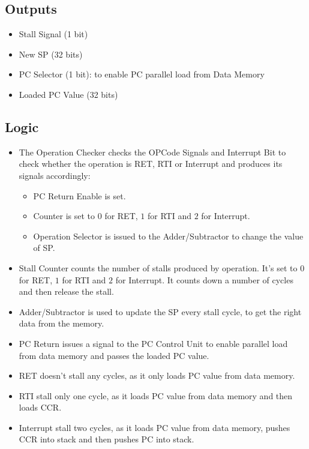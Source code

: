 \subsection{Outputs}
\begin{itemize}
    \item Stall Signal (1 bit)
    \item New SP (32 bits)
    \item PC Selector (1 bit): to enable PC parallel load from Data Memory
    \item Loaded PC Value (32 bits)
\end{itemize}

\subsection{Logic}
\begin{itemize}
    \item The Operation Checker checks the OPCode Signals and Interrupt Bit to check whether the operation is RET, RTI or Interrupt and produces its signals accordingly:
    \begin{itemize}
        \item PC Return Enable is set.
        \item Counter is set to $0$ for RET, $1$ for RTI and $2$ for Interrupt.
        \item Operation Selector is issued to the Adder/Subtractor to change the value of SP.
    \end{itemize}
    \item Stall Counter counts the number of stalls produced by operation. It's set to $0$ for RET, $1$ for RTI and $2$ for Interrupt. It counts down a number of cycles and then release the stall.
    \item Adder/Subtractor is used to update the SP every stall cycle, to get the right data from the memory.
    \item PC Return issues a signal to the PC Control Unit to enable parallel load from data memory and passes the loaded PC value.
    \item RET doesn't stall any cycles, as it only loads PC value from data memory.
    \item RTI stall only one cycle, as it loads PC value from data memory and then loads CCR.
    \item Interrupt stall two cycles, as it loads PC value from data memory, pushes CCR into stack and then pushes PC into stack.
\end{itemize}
